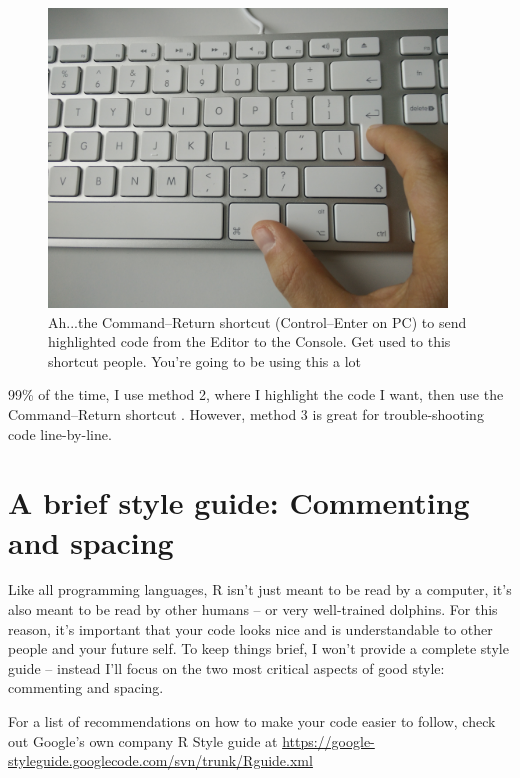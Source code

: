 \documentclass[]{book}
\theoremstyle{definition}
\theoremstyle{definition}
\theoremstyle{remark}
\begin{document}
\begin{figure}

{\centering \includegraphics[width=400px]{images/commandreturn} 

}

\caption{Ah...the Command--Return shortcut (Control--Enter on PC) to send highlighted code from the Editor to the Console. Get used to this shortcut people. You're going to be using this a lot}\label{fig:commandreturn}
\end{figure}

99\% of the time, I use method 2, where I highlight the code I want,
then use the Command--Return shortcut . However, method 3 is great for
trouble-shooting code line-by-line.

\section{A brief style guide: Commenting and
spacing}\label{a-brief-style-guide-commenting-and-spacing}

Like all programming languages, R isn't just meant to be read by a
computer, it's also meant to be read by other humans -- or very
well-trained dolphins. For this reason, it's important that your code
looks nice and is understandable to other people and your future self.
To keep things brief, I won't provide a complete style guide -- instead
I'll focus on the two most critical aspects of good style: commenting
and spacing.

For a list of recommendations on how to make your code easier to follow,
check out Google's own company R Style guide at
\url{https://google-styleguide.googlecode.com/svn/trunk/Rguide.xml}
\end{document}
